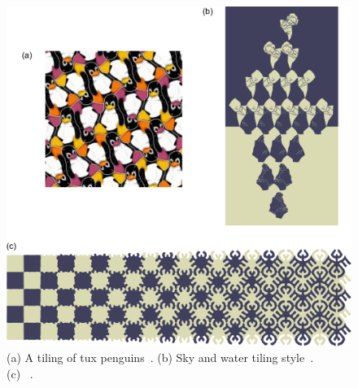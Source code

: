 \begin{figure}
\centering
\includegraphics[width=1.0\textwidth]{figures/related/tilings.pdf} 
\caption[Tilings]
{\label{fig_related_escherization} 
\newtext
{
(a) A tiling of tux penguins~\cite{Kaplan2000}.
(b) Sky and water tiling style~\cite{Kaplan2004}. \\
(c) ~\cite{Kaplan2010}.
}
}
\end{figure}








